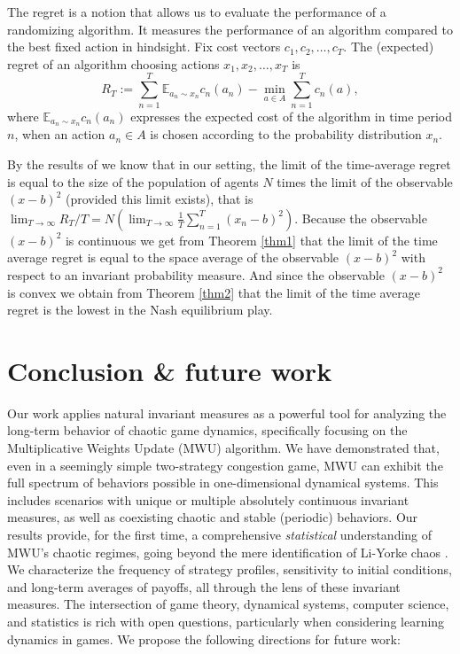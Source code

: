 \documentclass[format=acmsmall, authorversion, screen=true]{acmart}
\begin{document}
The regret is a notion that allows us to evaluate the performance of a randomizing algorithm. It measures the performance of an algorithm compared to the best fixed action in hindsight.
Fix cost vectors $c_1, c_2, \ldots, c_T$. The (expected) regret of an algorithm choosing actions $x_1, x_2, \ldots, x_T$ is
\[
 R_T := \sum_{n=1}^T \mathbb{E}_{a_n \sim x_n} c_n(a_n) - \min_{a \in A} \sum_{n=1}^T c_n(a),
\]
where $\mathbb{E}_{a_n \sim x_n} c_n(a_n)$ expresses the expected cost of the algorithm in time period $n$, when an action $a_n \in A$ is chosen according to the probability distribution $x_n$.

By the results of \cite{CFMP2019} we know that in our setting, the limit of the time-average regret is equal to the size of the population of agents $N$ times the limit of the observable $(x-b)^2$ (provided this limit exists), that is
$ \lim_{T \to \infty} R_T/T = N \left( \lim_{T \to \infty} \frac{1}{T} \sum_{n=1}^T (x_n - b)^2 \right)$.
Because the observable $(x-b)^2$ is continuous we get from Theorem \ref{thm1} that the limit of the time average regret is equal to the space average of the observable $(x-b)^2$ with respect to an invariant probability measure. And since the observable $(x-b)^2$ is convex we obtain from Theorem \ref{thm2} that the limit of the time average regret is the lowest in the Nash equilibrium play.




\section{Conclusion \& future work}
\label{sec:discussion}

Our work applies natural invariant measures as a powerful tool for analyzing the long-term behavior of chaotic game dynamics, specifically focusing on the Multiplicative Weights Update (MWU) algorithm. We have demonstrated that, even in a seemingly simple two-strategy congestion game, MWU can exhibit the full spectrum of behaviors possible in one-dimensional dynamical systems.  This includes scenarios with unique or multiple absolutely continuous invariant measures, as well as coexisting chaotic and stable (periodic) behaviors.  Our results provide, for the first time, a comprehensive \emph{statistical} understanding of MWU's chaotic regimes, going beyond the mere identification of Li-Yorke chaos \cite{liyorke}. We characterize the frequency of strategy profiles, sensitivity to initial conditions, and long-term averages of payoffs, all through the lens of these invariant measures.
The intersection of game theory, dynamical systems, computer science, and statistics is rich with open questions, particularly when considering learning dynamics in games. We propose the following directions for future work:
\end{document}

